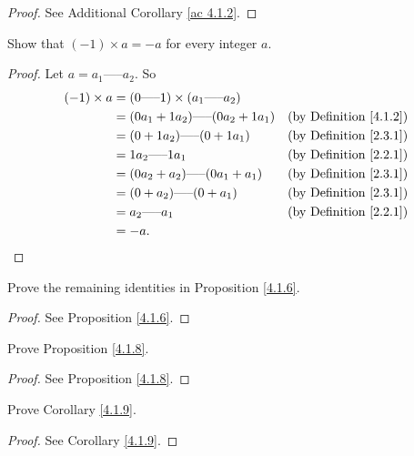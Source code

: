 \begin{proof}
See Additional Corollary \ref{ac 4.1.2}.
\end{proof}

\begin{exercise}\label{ex 4.1.3}
Show that \((-1) \times a = -a\) for every integer \(a\).
\end{exercise}

\begin{proof}
Let \(a = a_1 \text{-----} a_2\).
So
\begin{align*}
(-1) \times a &= (0 \text{-----} 1) \times (a_1 \text{-----} a_2) \\
&= (0a_1 + 1a_2) \text{-----} (0a_2 + 1a_1) & \text{(by Definition \ref{4.1.2})} \\
&= (0 + 1a_2) \text{-----} (0 + 1a_1) & \text{(by Definition \ref{2.3.1})} \\
&= 1a_2 \text{-----} 1a_1 & \text{(by Definition \ref{2.2.1})} \\
&= (0a_2 + a_2) \text{-----} (0a_1 + a_1) & \text{(by Definition \ref{2.3.1})} \\
&= (0 + a_2) \text{-----} (0 + a_1) & \text{(by Definition \ref{2.3.1})} \\
&= a_2 \text{-----} a_1 & \text{(by Definition \ref{2.2.1})} \\
&= -a.
\end{align*}
\end{proof}

\begin{exercise}\label{ex 4.1.4}
Prove the remaining identities in Proposition \ref{4.1.6}.
\end{exercise}

\begin{proof}
See Proposition \ref{4.1.6}.
\end{proof}

\begin{exercise}\label{ex 4.1.5}
Prove Proposition \ref{4.1.8}.
\end{exercise}

\begin{proof}
See Proposition \ref{4.1.8}.
\end{proof}

\begin{exercise}\label{ex 4.1.6}
Prove Corollary \ref{4.1.9}.
\end{exercise}

\begin{proof}
See Corollary \ref{4.1.9}.
\end{proof}

